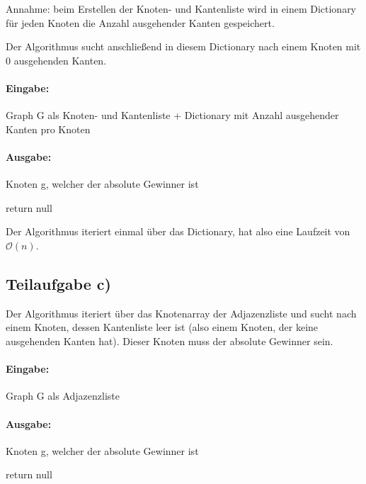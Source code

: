 \documentclass[12pt]{scrartcl}%
\theoremstyle{nonumberplain}
\newcommand{\bO}[1]{\mathcal O(#1)}
\begin{document}
Annahme: beim Erstellen der Knoten- und Kantenliste wird in einem Dictionary für jeden Knoten die Anzahl ausgehender Kanten gespeichert. 

Der Algorithmus sucht anschließend in diesem Dictionary nach einem Knoten mit 0 ausgehenden Kanten.

\paragraph{Eingabe:} Graph G als Knoten- und Kantenliste + Dictionary mit Anzahl ausgehender Kanten pro Knoten

\paragraph{Ausgabe:} Knoten g, welcher der absolute Gewinner ist

\begin{algorithm}
	 {
	}
	return null\;
\end{algorithm}

Der Algorithmus iteriert einmal über das Dictionary, hat also eine Laufzeit von $\bO{n}$.

\subsection*{Teilaufgabe c)}

Der Algorithmus iteriert über das Knotenarray der Adjazenzliste und sucht nach einem Knoten, dessen Kantenliste leer ist (also einem Knoten, der keine ausgehenden Kanten hat). Dieser Knoten muss der absolute Gewinner sein.

\paragraph{Eingabe:} Graph G als Adjazenzliste

\paragraph{Ausgabe:} Knoten g, welcher der absolute Gewinner ist

\begin{algorithm}
	 {
	}
	return null\;
\end{algorithm}
\end{document}

